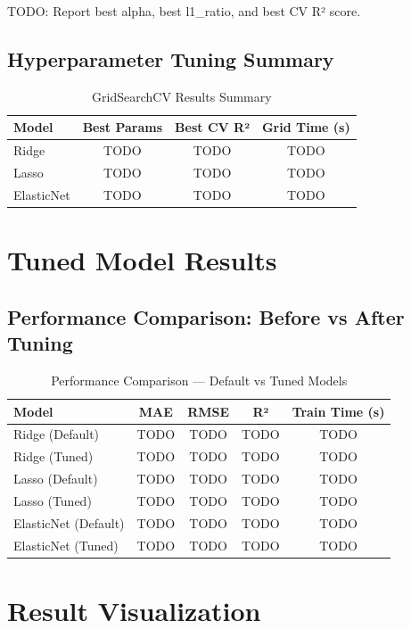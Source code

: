 \documentclass[12pt,a4paper]{article}
\begin{document}
TODO: Report best alpha, best l1\_ratio, and best CV R² score.

\subsection{Hyperparameter Tuning Summary}
\begin{table}[H]
\centering
\begin{tabular}{lccc}
\toprule
\textbf{Model} & \textbf{Best Params} & \textbf{Best CV R²} & \textbf{Grid Time (s)} \\ \midrule
Ridge & TODO & TODO & TODO \\
Lasso & TODO & TODO & TODO \\
ElasticNet & TODO & TODO & TODO \\
\bottomrule
\end{tabular}
\caption{GridSearchCV Results Summary}
\end{table}

\section{Tuned Model Results}
\subsection{Performance Comparison: Before vs After Tuning}
\begin{table}[H]
\centering
\begin{tabular}{lcccc}
\toprule
\textbf{Model} & \textbf{MAE} & \textbf{RMSE} & \textbf{R²} & \textbf{Train Time (s)} \\ \midrule
Ridge (Default) & TODO & TODO & TODO & TODO \\
Ridge (Tuned) & TODO & TODO & TODO & TODO \\
Lasso (Default) & TODO & TODO & TODO & TODO \\
Lasso (Tuned) & TODO & TODO & TODO & TODO \\
ElasticNet (Default) & TODO & TODO & TODO & TODO \\
ElasticNet (Tuned) & TODO & TODO & TODO & TODO \\
\bottomrule
\end{tabular}
\caption{Performance Comparison — Default vs Tuned Models}
\end{table}

\section{Result Visualization}
\end{document}
